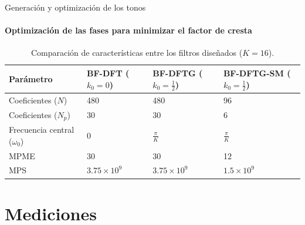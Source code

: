 \documentclass[ignorenonframetext,12pt]{beamer}
\begin{document}
\begin{frame}{Generación y optimización de los tonos}
	\framesubtitle{Optimización de las fases para minimizar el factor de cresta}
	\begin{table}[!t]
  \renewcommand{\arraystretch}{1.3}
  \caption{Comparación de características entre los filtros diseñados ($K=16$).}
  \label{table_proto_compa}
  \centering
  \begin{tabular}{l p{3.2cm} p{3.1cm} p{3.1cm}}
    \hline
    \textbf{Parámetro} & \textbf{BF-DFT \newline($k_0=0$)} & \textbf{BF-DFTG ($k_0=\frac{1}{2}$)} &
    \textbf{BF-DFTG-SM ($k_0=\frac{1}{2}$)}\\
    \hline\hline
    Coeficientes ($N$)            & 480             & 480             & 96 \\
    Coeficientes ($N_p$)          & 30              & 30              & 6  \\
    Frecuencia central ($\omega_0$) & 0               & $\frac{\pi}{K}$ & $\frac{\pi}{K}$\\
    MPME\footnotemark             & 30              & 30              & 12 \\
    MPS                           & $3.75\times10^9$& $3.75\times10^9$& $1.5\times10^9$\\
    \hline
  \end{tabular}
\end{table}

\end{frame}

\section{Mediciones}
\end{document}

